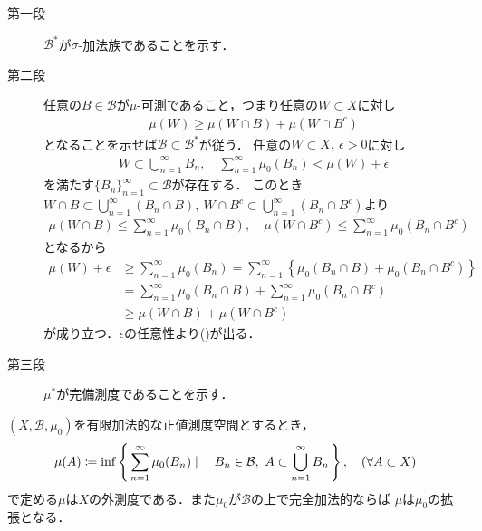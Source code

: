 		\begin{prf}\mbox{}
			\begin{description}
				\item[第一段]
					$\mathcal{B}^*$が$\sigma$-加法族であることを示す．
				
				\item[第二段]
					任意の$B \in \mathcal{B}$が$\mu$-可測であること，つまり任意の$W \subset X$に対し
					\begin{align}
						\mu(W) \geq \mu(W \cap B) + \mu(W \cap B^c)
						\label{eq:thm_Caratheodory_extension_theorem}
					\end{align}
					となることを示せば$\mathcal{B} \subset \mathcal{B}^*$が従う．
					任意の$W \subset X,\ \epsilon > 0$に対し
					\begin{align}
						W \subset \bigcup_{n=1}^\infty B_n,
						\quad \sum_{n=1}^\infty \mu_0(B_n) < \mu(W) + \epsilon
					\end{align}
					を満たす$\{B_n\}_{n=1}^\infty \subset \mathcal{B}$が存在する．
					このとき$W \cap B \subset \bigcup_{n=1}^\infty (B_n \cap B)
					,\ W \cap B^c \subset \bigcup_{n=1}^\infty (B_n \cap B^c)$より
					\begin{align}
						\mu(W \cap B) \leq \sum_{n=1}^\infty \mu_0(B_n \cap B),
						\quad \mu(W \cap B^c) \leq \sum_{n=1}^\infty \mu_0(B_n \cap B^c)
					\end{align}
					となるから
					\begin{align}
						\mu(W) + \epsilon
						&\geq \sum_{n=1}^\infty \mu_0(B_n)
						= \sum_{n=1}^\infty \left\{ \mu_0(B_n \cap B) + \mu_0(B_n \cap B^c) \right\} \\
						&= \sum_{n=1}^\infty \mu_0(B_n \cap B) + \sum_{n=1}^\infty \mu_0(B_n \cap B^c) \\
						&\geq \mu(W \cap B) + \mu(W \cap B^c)
					\end{align}
					が成り立つ．$\epsilon$の任意性より()が出る．
					
				\item[第三段]
					$\mu^*$が完備測度であることを示す．
					\QED
			\end{description}
		\end{prf}
		
		\begin{screen}
			\begin{thm}[有限加法的な正値測度により定まる外測度]\label{thm:outer_measure_finitely_additive_measure}
				$(X,\mathcal{B},\mu_0)$を有限加法的な正値測度空間とするとき，
				\begin{align}
					\mu(A) \coloneqq \operatorname*{inf}_{} \left\{\, \sum_{n=1}^\infty \mu_0(B_n) \mid \quad B_n \in \mathcal{B},\ A \subset \bigcup_{n=1}^\infty B_n\, \right\},
					\quad (\forall A \subset X)
				\end{align}
				で定める$\mu$は$X$の外測度である．また$\mu_0$が$\mathcal{B}$の上で完全加法的ならば
				$\mu$は$\mu_0$の拡張となる．
			\end{thm}
		\end{screen}
		
